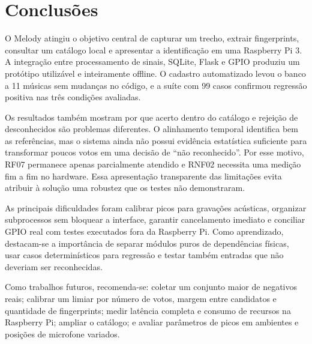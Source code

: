 \documentclass[12pt,a4paper]{article}
\begin{document}
\section{Conclusões}

O Melody atingiu o objetivo central de capturar um trecho, extrair fingerprints,
consultar um catálogo local e apresentar a identificação em uma Raspberry Pi 3.
A integração entre processamento de sinais, SQLite, Flask e GPIO produziu um
protótipo utilizável e inteiramente offline. O cadastro automatizado levou o banco
a 11 músicas sem mudanças no código, e a suíte com 99 casos confirmou regressão
positiva nas três condições avaliadas.

Os resultados também mostram por que acerto dentro do catálogo e rejeição de
desconhecidos são problemas diferentes. O alinhamento temporal identifica bem as
referências, mas o sistema ainda não possui evidência estatística suficiente para
transformar poucos votos em uma decisão de “não reconhecido”. Por esse motivo,
RF07 permanece apenas parcialmente atendido e RNF02 necessita uma medição fim a
fim no hardware. Essa apresentação transparente das limitações evita atribuir à
solução uma robustez que os testes não demonstraram.

As principais dificuldades foram calibrar picos para gravações acústicas,
organizar subprocessos sem bloquear a interface, garantir cancelamento imediato
e conciliar GPIO real com testes executados fora da Raspberry Pi. Como aprendizado,
destacam-se a importância de separar módulos puros de dependências físicas, usar
casos determinísticos para regressão e testar também entradas que não deveriam
ser reconhecidas.

Como trabalhos futuros, recomenda-se: coletar um conjunto maior de negativos
reais; calibrar um limiar por número de votos, margem entre candidatos e quantidade
de fingerprints; medir latência completa e consumo de recursos na Raspberry Pi;
ampliar o catálogo; e avaliar parâmetros de picos em ambientes e posições de
microfone variados.
\end{document}
